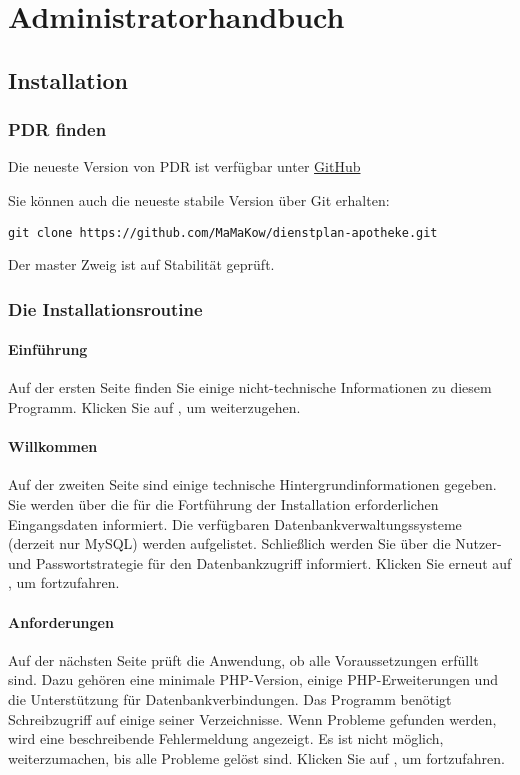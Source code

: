 \chapter{Administratorhandbuch}

\section{Installation}\label{chapter_admin_section_install}

\subsection{PDR finden}
Die neueste Version von PDR ist verfügbar unter
\href{https://github.com/MaMaKow/dienstplan-apotheke/releases}{GitHub}

Sie können auch die neueste stabile Version über Git erhalten:
\begin{lstlisting}
git clone https://github.com/MaMaKow/dienstplan-apotheke.git
\end{lstlisting}
Der master Zweig ist auf Stabilität geprüft.

\subsection{Die Installationsroutine}

\subsubsection{Einführung}
Auf der ersten Seite finden Sie einige nicht-technische Informationen zu
diesem Programm. Klicken Sie auf , um weiterzugehen.

\subsubsection{Willkommen}
Auf der zweiten Seite sind einige technische Hintergrundinformationen
gegeben. Sie werden über die für die Fortführung der Installation
erforderlichen Eingangsdaten informiert. Die verfügbaren
Datenbankverwaltungssysteme (derzeit nur MySQL) werden
aufgelistet. Schließlich werden Sie über die Nutzer-und Passwortstrategie
für den Datenbankzugriff informiert. Klicken Sie erneut auf , um
fortzufahren.

\subsubsection{Anforderungen}
Auf der nächsten Seite prüft die Anwendung, ob alle Voraussetzungen erfüllt
sind. Dazu gehören eine minimale PHP-Version, einige PHP-Erweiterungen und
die Unterstützung für Datenbankverbindungen. Das Programm benötigt
Schreibzugriff auf einige seiner Verzeichnisse.  Wenn Probleme gefunden
werden, wird eine beschreibende Fehlermeldung angezeigt. Es ist nicht
möglich, weiterzumachen, bis alle Probleme gelöst sind.  Klicken Sie auf
, um fortzufahren.

